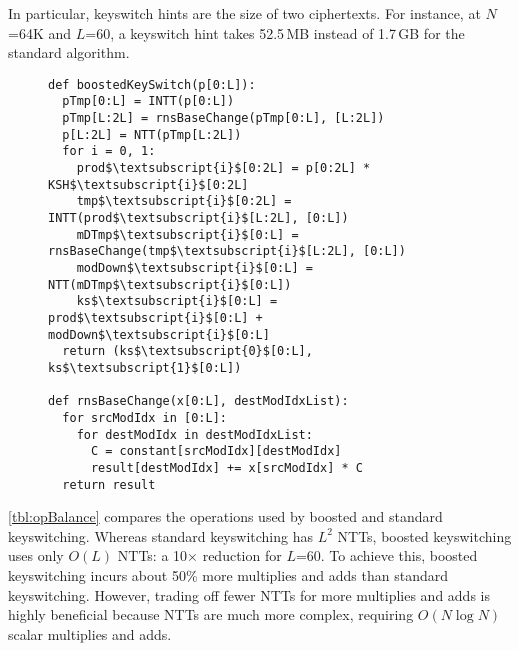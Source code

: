 In particular, keyswitch hints are the size of
two
ciphertexts.
For instance, at $N$=64K and $L$=60,
a keyswitch hint takes 52.5\,MB
instead of 1.7\,GB for the standard algorithm.
%
    \begin{figure}\label{lst:boostedKeyswitching}
      \begin{center}
          \begin{lstlisting}[caption={Boosted keyswitching implementation (1-digit).}, mathescape=true, label=listing:boostedKeyswitching]
def boostedKeySwitch(p[0:L]):
  pTmp[0:L] = INTT(p[0:L])
  pTmp[L:2L] = rnsBaseChange(pTmp[0:L], [L:2L])
  p[L:2L] = NTT(pTmp[L:2L])
  for i = 0, 1:
    prod$\textsubscript{i}$[0:2L] = p[0:2L] * KSH$\textsubscript{i}$[0:2L]
    tmp$\textsubscript{i}$[0:2L] = INTT(prod$\textsubscript{i}$[L:2L], [0:L])
    mDTmp$\textsubscript{i}$[0:L] = rnsBaseChange(tmp$\textsubscript{i}$[L:2L], [0:L])
    modDown$\textsubscript{i}$[0:L] = NTT(mDTmp$\textsubscript{i}$[0:L])
    ks$\textsubscript{i}$[0:L] = prod$\textsubscript{i}$[0:L] + modDown$\textsubscript{i}$[0:L]
  return (ks$\textsubscript{0}$[0:L], ks$\textsubscript{1}$[0:L])

def rnsBaseChange(x[0:L], destModIdxList):
  for srcModIdx in [0:L]:
    for destModIdx in destModIdxList:
      C = constant[srcModIdx][destModIdx]
      result[destModIdx] += x[srcModIdx] * C
  return result
          \end{lstlisting}
        \end{center}
	\vspace{6pt}
      \end{figure}

\tblOpBalance

\autoref{tbl:opBalance} compares the operations used by boosted and standard keyswitching.
Whereas standard keyswitching has $L^2$ NTTs, boosted keyswitching uses only $O(L)$ NTTs:
a 10$\times$ reduction for $L$=60. To achieve this, boosted keyswitching incurs about 50\%
more multiplies and adds than standard keyswitching.
However, trading off fewer NTTs for more multiplies and adds is highly beneficial
because NTTs are much more complex, requiring $O(N \log N)$ scalar multiplies and adds.

